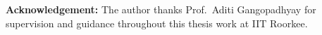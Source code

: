 \medskip
\textbf{Acknowledgement:} The author thanks Prof.\ Aditi Gangopadhyay for supervision and guidance throughout this thesis work at IIT Roorkee.

\medskip
\begin{center}
\end{center}
